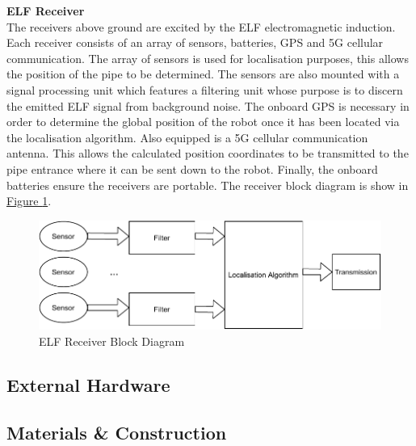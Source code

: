 \documentclass[11pt]{article}		%
\newcommand{\figref}[1]{\hyperref[#1]{Figure \ref*{#1}}}    %
\begin{document}
			\textbf{ELF Receiver}\\
			The receivers above ground are excited by the ELF electromagnetic induction. Each receiver consists of an array of sensors, batteries, GPS and 5G cellular communication. The array of sensors is used for localisation purposes, this allows the position of the pipe to be determined. The sensors are also mounted with a signal processing unit which features a filtering unit whose purpose is to discern the emitted ELF signal from background noise. The onboard GPS is necessary in order to determine the global position of the robot once it has been located via the localisation algorithm. Also equipped is a 5G cellular communication antenna. This allows the calculated position coordinates to be transmitted to the pipe entrance where it can be sent down to the robot.  Finally, the onboard batteries ensure the receivers are portable. The receiver block diagram is show in \figref{ELFrec}.
		    
		    \begin{figure}[h]
				\centering
				\includegraphics[scale=0.7]{blockreceiever.pdf}
				\caption{ELF Receiver Block Diagram}
				\label{ELFrec}
			\end{figure}
	
		\subsection{External Hardware}
		
		
	
		\subsection{Materials \& Construction}
		
\end{document}
